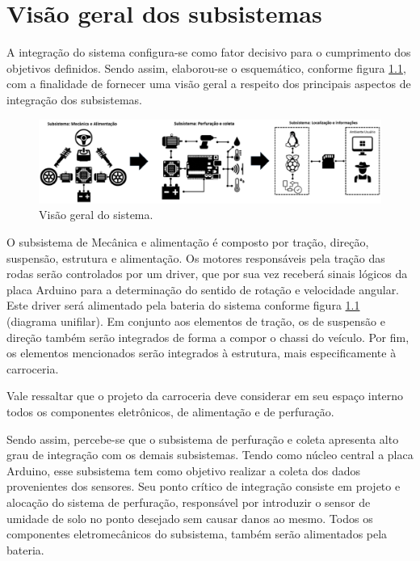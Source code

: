 \chapter{Visão geral dos subsistemas}

A integração do sistema configura-se como fator decisivo para o cumprimento dos objetivos definidos.
Sendo assim, elaborou-se o esquemático, conforme figura \ref{fig:visao_geral}, com a finalidade de fornecer uma visão geral a
respeito dos principais aspectos de integração dos subsistemas.

\begin{figure}[!htbp]
\begin{center}
\includegraphics[width=.9\textwidth]{figuras/visao_geral.eps}
\caption{\label{fig:visao_geral}Visão geral do sistema.}
\end{center}
\end{figure}


O subsistema de Mecânica e alimentação é composto por tração, direção, suspensão, estrutura e alimentação. Os motores
responsáveis pela tração das rodas serão controlados por um driver, que por sua vez receberá sinais lógicos da placa Arduino
para a determinação do sentido de rotação e velocidade angular. Este driver será alimentado pela bateria do sistema conforme
figura \ref{fig:visao_geral} (diagrama unifilar). Em conjunto aos elementos de tração, os de suspensão e direção também serão integrados de forma
a compor o chassi do veículo. Por fim, os elementos mencionados serão integrados à estrutura, mais especificamente à carroceria.

Vale ressaltar que o projeto da carroceria deve considerar em seu espaço interno todos os componentes eletrônicos, de
alimentação e de perfuração.

Sendo assim, percebe-se que o subsistema de perfuração e coleta apresenta alto grau de integração com os demais subsistemas.
Tendo como núcleo central a placa Arduino, esse subsistema tem como objetivo realizar a coleta dos dados provenientes dos
sensores. Seu ponto crítico de integração consiste em projeto e alocação do sistema de perfuração, responsável por introduzir
o sensor de umidade de solo no ponto desejado sem causar danos ao mesmo. Todos os componentes eletromecânicos do subsistema,
também serão alimentados pela bateria.

